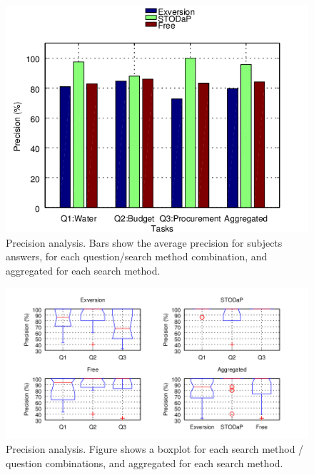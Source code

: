 \begin{figure}[h!]
\begin{center}
\includegraphics[scale=1.2]{images/precision.png}
\caption[Precision analysis: Average.]{Precision analysis. Bars show the average precision for subjects answers, for each question/search method combination, and aggregated for each search method.}
\label{fig:precision}
\end{center}
\end{figure}

\begin{figure}[h!]
\begin{center}
\includegraphics[width=\columnwidth]{images/precision_boxplot.png}
\caption[Precision analysis: Boxplot.]{Precision analysis. Figure shows a boxplot for each search method / question combinations, and aggregated for each search method.}
\label{fig:precision_boxplot}
\end{center}
\end{figure}


